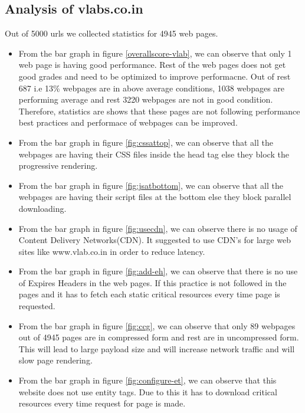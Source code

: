 \documentclass[conference]{IEEEtran}
\begin{document}
\subsection{Analysis of vlabs.co.in}
 Out of 5000 urls we collected statistics for 4945 web pages.
\begin{itemize}
\item From the bar graph in figure \ref{overallscore-vlab}, we can observe that only 1 web page is having good
performance. Rest of the web pages does not get good grades and need to be
optimized to improve performacne. Out of rest 687 i.e 13\% webpages are in above average conditions, 1038
webpages are performing average and rest 3220 webpages are not in good
condition. Therefore, statistics are shows that these pages are not following
performance best practices and performace of webpages can be improved.  
 
\item From the bar graph in figure \ref{fig:cssattop}, we can observe that all the webpages are having their
CSS files inside the head tag else they block the progressive rendering.

\item From the bar graph in figure \ref{fig:jsatbottom}, we can observe that all the webpages are having their
script files at the bottom else they block parallel downloading.

\item From the bar graph in figure \ref{fig:usecdn}, we can observe there is no usage of Content Delivery
Networks(CDN). It suggested to use CDN's for large web sites like www.vlab.co.in in order to reduce latency.

\item From the bar graph in figure \ref{fig:add-eh}, we can observe that there is no use of Expires
Headers in the web pages. If this practice is not followed in the pages and it has to
fetch each static critical resources every time page is requested.

\item From the bar graph in figure \ref{fig:ccg}, we can observe that only 89 webpages out of 4945
pages are in compressed form and rest are in uncompressed form. This will lead to
large payload size and will increase network traffic and will slow page
rendering.

\item From the bar graph in figure \ref{fig:configure-et}, we can observe that this website does not use entity
tags. Due to this it has to download critical resources every time request for page is made.


\end{itemize}
\end{document}
